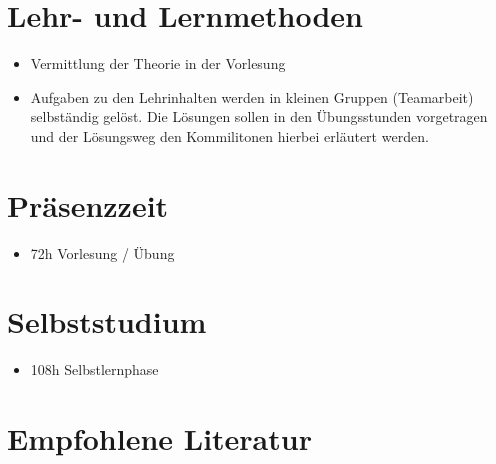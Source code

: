 \hypertarget{lehr--und-lernmethodenpathlabel....srcmodulbeschreibungen-bachelor-bpo5ba_theoretischeinformatik}{%
\section*{Lehr- und
Lernmethoden\label{../../src/modulbeschreibungen-bachelor-bpo5/BA_TheoretischeInformatik}}\label{lehr--und-lernmethodenpathlabel....srcmodulbeschreibungen-bachelor-bpo5ba_theoretischeinformatik}}

\begin{itemize}
\tightlist
\item
  Vermittlung der Theorie in der Vorlesung
\item
  Aufgaben zu den Lehrinhalten werden in kleinen Gruppen (Teamarbeit)
  selbständig gelöst. Die Lösungen sollen in den Übungsstunden
  vorgetragen und der Lösungsweg den Kommilitonen hierbei erläutert
  werden.
\end{itemize}

\hypertarget{pruxe4senzzeitpathlabel....srcmodulbeschreibungen-bachelor-bpo5ba_theoretischeinformatik}{%
\section*{Präsenzzeit\label{../../src/modulbeschreibungen-bachelor-bpo5/BA_TheoretischeInformatik}}\label{pruxe4senzzeitpathlabel....srcmodulbeschreibungen-bachelor-bpo5ba_theoretischeinformatik}}

\begin{itemize}
\tightlist
\item
  72h Vorlesung / Übung
\end{itemize}

\hypertarget{selbststudiumpathlabel....srcmodulbeschreibungen-bachelor-bpo5ba_theoretischeinformatik}{%
\section*{Selbststudium\label{../../src/modulbeschreibungen-bachelor-bpo5/BA_TheoretischeInformatik}}\label{selbststudiumpathlabel....srcmodulbeschreibungen-bachelor-bpo5ba_theoretischeinformatik}}

\begin{itemize}
\tightlist
\item
  108h Selbstlernphase
\end{itemize}

\hypertarget{empfohlene-literaturpathlabel....srcmodulbeschreibungen-bachelor-bpo5ba_theoretischeinformatik}{%
\section*{Empfohlene
Literatur\label{../../src/modulbeschreibungen-bachelor-bpo5/BA_TheoretischeInformatik}}\label{empfohlene-literaturpathlabel....srcmodulbeschreibungen-bachelor-bpo5ba_theoretischeinformatik}}

